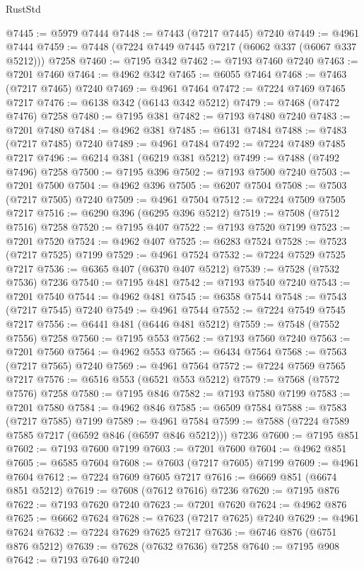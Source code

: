 \begin{lexlean}{RustStd}
\begin{coremodule}
@7445 := @5979 @7444
@7448 := @7443 (@7217 @7445) @7240
@7449 := @4961 @7444
@7459 := @7448 (@7224 @7449 @7445 @7217 (@6062 @337 (@6067 @337 @5212))) @7258
@7460 := @7195 @342
@7462 := @7193 @7460 @7240
@7463 := @7201 @7460
@7464 := @4962 @342
@7465 := @6055 @7464
@7468 := @7463 (@7217 @7465) @7240
@7469 := @4961 @7464
@7472 := @7224 @7469 @7465 @7217
@7476 := @6138 @342 (@6143 @342 @5212)
@7479 := @7468 (@7472 @7476) @7258
@7480 := @7195 @381
@7482 := @7193 @7480 @7240
@7483 := @7201 @7480
@7484 := @4962 @381
@7485 := @6131 @7484
@7488 := @7483 (@7217 @7485) @7240
@7489 := @4961 @7484
@7492 := @7224 @7489 @7485 @7217
@7496 := @6214 @381 (@6219 @381 @5212)
@7499 := @7488 (@7492 @7496) @7258
@7500 := @7195 @396
@7502 := @7193 @7500 @7240
@7503 := @7201 @7500
@7504 := @4962 @396
@7505 := @6207 @7504
@7508 := @7503 (@7217 @7505) @7240
@7509 := @4961 @7504
@7512 := @7224 @7509 @7505 @7217
@7516 := @6290 @396 (@6295 @396 @5212)
@7519 := @7508 (@7512 @7516) @7258
@7520 := @7195 @407
@7522 := @7193 @7520 @7199
@7523 := @7201 @7520
@7524 := @4962 @407
@7525 := @6283 @7524
@7528 := @7523 (@7217 @7525) @7199
@7529 := @4961 @7524
@7532 := @7224 @7529 @7525 @7217
@7536 := @6365 @407 (@6370 @407 @5212)
@7539 := @7528 (@7532 @7536) @7236
@7540 := @7195 @481
@7542 := @7193 @7540 @7240
@7543 := @7201 @7540
@7544 := @4962 @481
@7545 := @6358 @7544
@7548 := @7543 (@7217 @7545) @7240
@7549 := @4961 @7544
@7552 := @7224 @7549 @7545 @7217
@7556 := @6441 @481 (@6446 @481 @5212)
@7559 := @7548 (@7552 @7556) @7258
@7560 := @7195 @553
@7562 := @7193 @7560 @7240
@7563 := @7201 @7560
@7564 := @4962 @553
@7565 := @6434 @7564
@7568 := @7563 (@7217 @7565) @7240
@7569 := @4961 @7564
@7572 := @7224 @7569 @7565 @7217
@7576 := @6516 @553 (@6521 @553 @5212)
@7579 := @7568 (@7572 @7576) @7258
@7580 := @7195 @846
@7582 := @7193 @7580 @7199
@7583 := @7201 @7580
@7584 := @4962 @846
@7585 := @6509 @7584
@7588 := @7583 (@7217 @7585) @7199
@7589 := @4961 @7584
@7599 := @7588 (@7224 @7589 @7585 @7217 (@6592 @846 (@6597 @846 @5212))) @7236
@7600 := @7195 @851
@7602 := @7193 @7600 @7199
@7603 := @7201 @7600
@7604 := @4962 @851
@7605 := @6585 @7604
@7608 := @7603 (@7217 @7605) @7199
@7609 := @4961 @7604
@7612 := @7224 @7609 @7605 @7217
@7616 := @6669 @851 (@6674 @851 @5212)
@7619 := @7608 (@7612 @7616) @7236
@7620 := @7195 @876
@7622 := @7193 @7620 @7240
@7623 := @7201 @7620
@7624 := @4962 @876
@7625 := @6662 @7624
@7628 := @7623 (@7217 @7625) @7240
@7629 := @4961 @7624
@7632 := @7224 @7629 @7625 @7217
@7636 := @6746 @876 (@6751 @876 @5212)
@7639 := @7628 (@7632 @7636) @7258
@7640 := @7195 @908
@7642 := @7193 @7640 @7240

\end{coremodule}
\end{lexlean}
